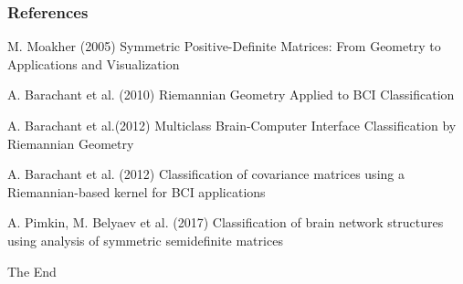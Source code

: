 \documentclass{beamer}
\begin{document}
\begin{frame}
\frametitle{References}
\footnotesize{
\begin{thebibliography}{99} %
 M. Moakher (2005)
\newblock Symmetric Positive-Deﬁnite Matrices: From Geometry to Applications and Visualization
	
 A. Barachant et al. (2010)
\newblock Riemannian Geometry Applied to BCI Classification

 A. Barachant et al.(2012)
\newblock Multiclass Brain-Computer Interface Classiﬁcation by Riemannian Geometry

 A. Barachant et al. (2012)
\newblock Classification of covariance matrices using a Riemannian-based kernel for BCI applications

  A. Pimkin, M. Belyaev et al. (2017)
\newblock Classification of brain network structures using analysis of symmetric semidefinite matrices

\end{thebibliography}
}
\end{frame}


\begin{frame}
\Huge{\centerline{The End}}
\end{frame}

\end{document}
